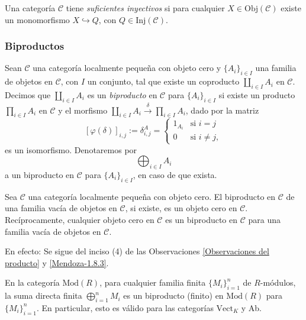 \documentclass[tesis]{subfiles}
\begin{document}
\begin{Def}\label{Def: Suficientes inyectivos}
    Una categoría $\mathscr{C}$ tiene \emph{suficientes inyectivos} si para cualquier $X\in\text{Obj}(\mathscr{C})$ existe un monomorfismo $X\hookrightarrow Q$, con $Q\in\text{Inj}(\mathscr{C})$.
\end{Def}


\subsubsection*{Biproductos} \label{Sssec: Biproductos}

\begin{Def}\label{Def: Biproducto}
    Sean $\mathscr{C}$ una categoría localmente pequeña con objeto cero y $\{A_i\}_{i\in I}$ una familia de objetos en $\mathscr{C}$, con $I$ un conjunto, tal que existe un coproducto $\coprod_{i\in I}A_i$ en $\mathscr{C}$. Decimos que $\coprod_{i\in I}A_i$ es un \emph{biproducto} en $\mathscr{C}$ para $\{A_i\}_{i\in I}$ si existe un producto $\prod_{i\in I}A_i$ en $\mathscr{C}$ y el morfismo $\coprod_{i\in I}A_i\xrightarrow[]{\delta} \prod_{i\in I}A_i$, dado por la matriz
    \[
    [\varphi(\delta)]_{i,j}:=\delta_{i,j}^A = \begin{cases} 1_{A_i} &\text{si } i=j \\ 0 &\text{si } i\neq j, \end{cases}
    \] 
    es un isomorfismo. Denotaremos por
    \[
    \bigoplus_{i\in I}A_i
    \] 
    a un biproducto en $\mathscr{C}$ para $\{A_i\}_{i\in I}$, en caso de que exista.
\end{Def}

\begin{Obs}\label{Observaciones del biproducto}
    Sea $\mathscr{C}$ una categoría localmente pequeña con objeto cero. El biproducto en $\mathscr{C}$ de una familia vacía de objetos en $\mathscr{C}$, si existe, es un objeto cero en $\mathscr{C}$. Recíprocamente, cualquier objeto cero en $\mathscr{C}$ es un biproducto en $\mathscr{C}$ para una familia vacía de objetos en $\mathscr{C}$.
    \vspace{1mm}

    En efecto: Se sigue del inciso (4) de las Observaciones \ref{Observaciones del producto} y \ref{Mendoza-1.8.3}.
\end{Obs}

\begin{Ejem}\label{Ejem: Biproductos finitos}
    En la categoría $\text{Mod}(R)$, para cualquier familia finita $\{M_i\}_{i=1}^n$ de $R$-módulos, la suma directa finita $\bigoplus_{i=1}^n M_i$ es un biproducto (finito) en $\text{Mod}(R)$ para $\{M_i\}_{i=1}^n$. En particular, esto es válido para las categorías $\text{Vect}_K$ y Ab.
\end{Ejem}
\end{document}

